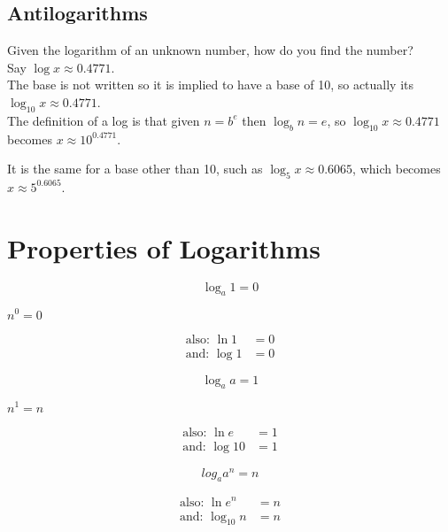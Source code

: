 \documentclass{article}
\begin{document}
\subsection*{Antilogarithms}
Given the logarithm of an unknown number, how do you find the number?\\

Say $\log{x}\approx0.4771$.\\

The base is not written so it is implied to have a base of 10, so actually its $\log_{10}{x}\approx0.4771$.\\

The definition of a log is that given $n = b^e$ then $\log_b{n}=e$,
so $\log_{10}{x}\approx0.4771$ becomes $x\approx10^{0.4771}$.

It is the same for a base other than 10, such as $\log_5{x}\approx0.6065$, which becomes $x\approx5^{0.6065}$.

\newpage
\section{Properties of Logarithms}

\begin{Large}
$$\log_a{1}=0$$
\end{Large}
\begin{center}
$n^0=0$
\end{center}
\begin{align*}
\text{also: }\ln{1}&=0\\
\text{and: }\log{1}&=0
\end{align*}

\begin{Large}
$$\log_a{a}=1$$
\end{Large}
\begin{center}
$n^1=n$\\
\end{center}

\begin{align*}
\text{also: }\ln{e}&=1\\
\text{and: }\log{10}&=1
\end{align*}

\begin{Large}
$$log_a{a^n}=n$$
\end{Large}
\begin{align*}
\text{also: }\ln{e^n}&=n\\
\text{and: }\log_10{n}&=n
\end{align*}
\end{document}
